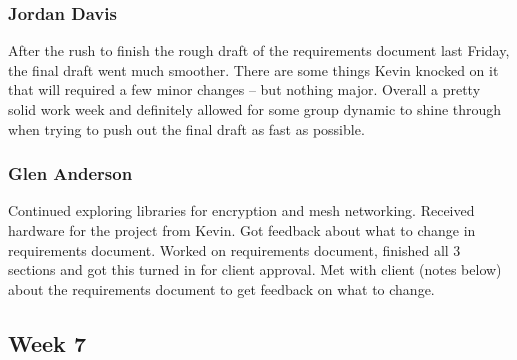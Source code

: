 \documentclass[onecolumn, draftclsnofoot,10pt, compsoc]{IEEEtran}
\begin{document}
\subsubsection{Jordan Davis}
After the rush to finish the rough draft of the requirements document last Friday, the final draft went much smoother. There are some things Kevin knocked on it that will required a few minor changes -- but nothing major. Overall a pretty solid work week and definitely allowed for some group dynamic to shine through when trying to push out the final draft as fast as possible.


\subsubsection{Glen Anderson}
Continued exploring libraries for encryption and mesh networking. Received hardware for the project from Kevin. Got feedback about what to change in requirements document.
Worked on requirements document, finished all 3 sections and got this turned in for client approval. Met with client (notes below) about the requirements document to get feedback on what to change.

\subsection{Week 7}
\end{document}
